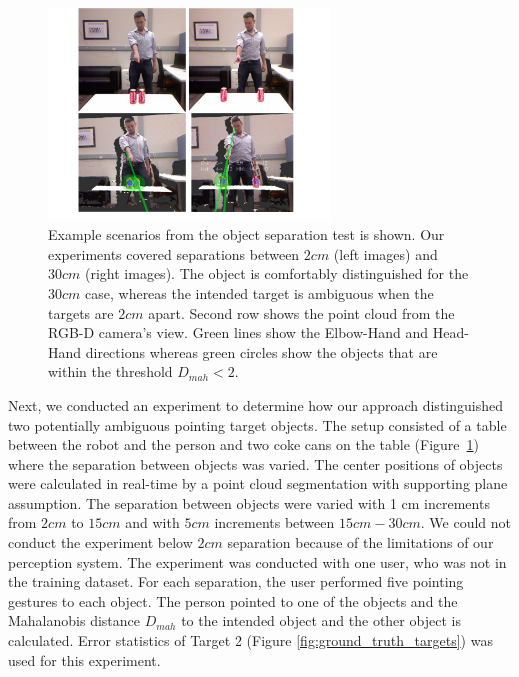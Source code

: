 \documentclass[3p]{elsarticle}
\begin{document}
\begin{figure}[ht!]
\centering
\includegraphics[width=75mm]{pics/separation_2_cropped}
\caption{Example scenarios from the object separation test is shown. Our experiments covered separations between $2cm$ (left images) and $30cm$ (right images). The object is comfortably distinguished for the $30cm$ case, whereas the intended target is ambiguous when the targets are $2cm$ apart. Second row shows the point cloud from the RGB-D camera's view. Green lines show the Elbow-Hand and Head-Hand directions whereas green circles show the objects that are within the threshold $D_{mah}<2$.}
\label{fig:separation}
\end{figure}


Next, we conducted an experiment to determine how our approach distinguished two potentially ambiguous pointing target objects. The setup consisted of a table between the robot and the person and two coke cans on the table (Figure~\ref{fig:separation}) where the separation between objects was varied. The center positions of objects were calculated in real-time by a point cloud segmentation with supporting plane assumption. The separation between objects were varied with 1 cm increments from $2 cm$ to $15 cm$ and with $5 cm$ increments between $15 cm-30 cm$. We could not conduct the experiment below $2 cm$ separation because of the limitations of our perception system. The experiment was conducted with one user, who was not in the training dataset. For each separation, the user performed five pointing gestures to each object. The person pointed to one of the objects and the Mahalanobis distance $D_{mah}$ to the intended object and the other object is calculated. Error statistics of Target 2 (Figure \ref{fig:ground_truth_targets}) was used for this experiment.
\end{document}
